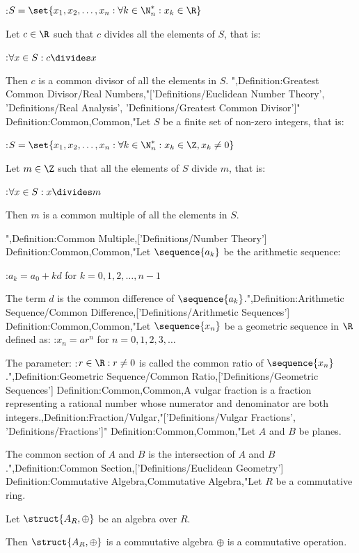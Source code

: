 :$S = \set {x_1, x_2, \ldots, x_n: \forall k \in \N^*_n: x_k \in \R}$


Let $c \in \R$ such that $c$ divides all the elements of $S$, that is:

:$\forall x \in S: c \divides x$


Then $c$ is a common divisor of all the elements in $S$.
",Definition:Greatest Common Divisor/Real Numbers,"['Definitions/Euclidean Number Theory', 'Definitions/Real Analysis', 'Definitions/Greatest Common Divisor']"
Definition:Common,Common,"Let $S$ be a finite set of non-zero integers, that is:

:$S = \set {x_1, x_2, \ldots, x_n: \forall k \in \N^*_n: x_k \in \Z, x_k \ne 0}$


Let $m \in \Z$ such that all the elements of $S$ divide $m$, that is:

:$\forall x \in S: x \divides m$


Then $m$ is a common multiple of all the elements in $S$.

",Definition:Common Multiple,['Definitions/Number Theory']
Definition:Common,Common,"Let $\sequence {a_k}$ be the arithmetic sequence:

:$a_k = a_0 + k d$ for $k = 0, 1, 2, \ldots, n - 1$


The term $d$ is the common difference of $\sequence {a_k}$.",Definition:Arithmetic Sequence/Common Difference,['Definitions/Arithmetic Sequences']
Definition:Common,Common,"Let $\sequence {x_n}$ be a geometric sequence in $\R$ defined as:
:$x_n = a r^n$ for $n = 0, 1, 2, 3, \ldots$


The parameter:
:$r \in \R: r \ne 0$
is called the common ratio of $\sequence {x_n}$.",Definition:Geometric Sequence/Common Ratio,['Definitions/Geometric Sequences']
Definition:Common,Common,A vulgar fraction is a fraction representing a rational number whose numerator and denominator are both integers.,Definition:Fraction/Vulgar,"['Definitions/Vulgar Fractions', 'Definitions/Fractions']"
Definition:Common,Common,"Let $A$ and $B$ be planes.

The common section of $A$ and $B$ is the intersection of $A$ and $B$.",Definition:Common Section,['Definitions/Euclidean Geometry']
Definition:Commutative Algebra,Commutative Algebra,"Let $R$ be a commutative ring.

Let $\struct {A_R, \oplus}$ be an algebra over $R$.


Then $\struct {A_R, \oplus}$ is a commutative algebra  $\oplus$ is a commutative operation.

